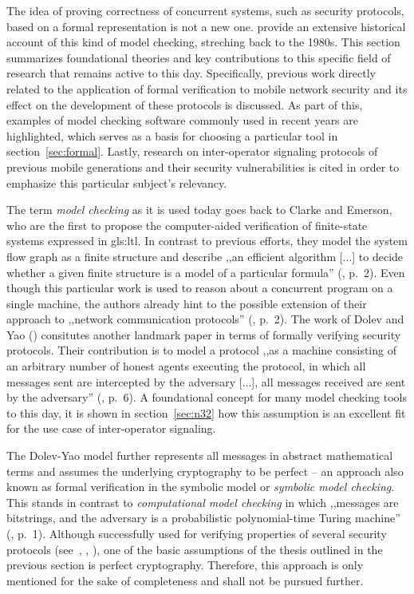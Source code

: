 The idea of proving correctness of concurrent systems, such as security protocols, based on a formal representation is not a new one.
\cite{basin2018model} provide an extensive historical account of this kind of model checking, streching back to the 1980s.
This section summarizes foundational theories and key contributions to this specific field of research that remains active to this day.
Specifically, previous work directly related to the application of formal verification to mobile network security and its effect on the development of these protocols is discussed.
As part of this, examples of model checking software commonly used in recent years are highlighted, which serves as a basis for choosing a particular tool in section~\ref{sec:formal}.
Lastly, research on inter-operator signaling protocols of previous mobile generations and their security vulnerabilities is cited in order to emphasize this particular subject's relevancy.

The term \textit{model checking} as it is used today goes back to Clarke and Emerson, who are the first to propose the computer-aided verification of finite-state systems expressed in \gls{gls:ltl}.
In contrast to previous efforts, they model the system flow graph as a finite structure and describe ,,an efficient algorithm [...] to decide whether a given finite structure is a model of a particular formula'' (\cite{clarke1981design}, p.~2).
Even though this particular work is used to reason about a concurrent program on a single machine, the authors already hint to the possible extension of their approach to ,,network communication protocols'' (\cite{clarke1981design}, p.~2).
The work of Dolev and Yao (\cite{dolev1983security}) consitutes another landmark paper in terms of formally verifying security protocols.
Their contribution is to model a protocol ,,as a machine consisting of an arbitrary number of honest agents executing the protocol, in which all messages sent are intercepted by the adversary [...], all messages received are sent by the adversary'' (\cite{basin2018model}, p.~6).
A foundational concept for many model checking tools to this day, it is shown in section~\ref{sec:n32} how this assumption is an excellent fit for the use case of inter-operator signaling.

The Dolev-Yao model further represents all messages in abstract mathematical terms and assumes the underlying cryptography to be perfect -- an approach also known as formal verification in the symbolic model or \textit{symbolic model checking}.
This stands in contrast to \textit{computational model checking} in which ,,messages are bitstrings, and the adversary is a probabilistic polynomial-time Turing machine'' (\cite{blanchet2008computationally}, p.~1).
Although successfully used for verifying properties of several security protocols (see~\cite{BlanchetJaggardScedrovTsayAsiaCCS08}, \cite{CadeBlanchetJoWUA13}, \cite{LippBlanchetBhargavanEuroSP19}), one of the basic assumptions of the thesis outlined in the previous section is perfect cryptography.
Therefore, this approach is only mentioned for the sake of completeness and shall not be pursued further.\medskip

